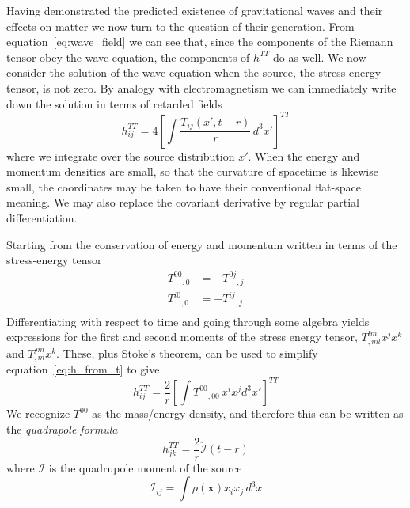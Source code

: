 Having demonstrated the predicted existence of gravitational waves and
their effects on matter we now turn to the question of their
generation.  From equation~\ref{eq:wave_field} we can see that, since
the components of the Riemann tensor obey the wave equation, the
components of $h^{TT}$ do as well.  We now consider the solution of
the wave equation when the source, the stress-energy tensor, is not
zero.  By analogy with electromagnetism we can immediately write down
the solution in terms of retarded fields
%
\begin{equation}
\label{eq:h_from_t}
h^{TT}_{ij} = 4 \left[ \int \frac{T_{ij}(x', t-r)}{r}\, d^3 x'
\right]^{TT}
\end{equation}
%
where we integrate over the source distribution $x'$.  When the energy
and momentum densities are small, so that the curvature of spacetime
is likewise small, the coordinates may be taken to have their
conventional flat-space meaning.  We may also replace the covariant
derivative by regular partial differentiation.

Starting from the conservation of energy and momentum written in terms
of the stress-energy tensor
%
\begin{align*}
{T^{00}}_{,0} &= - {T^{0j}}_{,j} \\
{T^{i0}}_{,0} &= - {T^{ij}}_{,j} \\
\end{align*}
%
Differentiating with respect to time and going through some algebra
yields expressions for the first and second moments of the stress
energy tensor, $T^{lm}_{,ml} x^j x^k$ and $T^{jm}_{,m} x^k$.  These,
plus Stoke's theorem, can be used to simplify
equation~\ref{eq:h_from_t} to give
%
\begin{equation*}
h^{TT}_{ij} = \frac{2}{r} \left[
\int {T^{00}}_{,00}\, x^i x^j d^3 x' \right]^{TT}
\end{equation*}
%
We recognize $T^{00}$ as the mass/energy density, and therefore this
can be written as the \emph{quadrapole formula}
%
\begin{equation}
\label{eq:quadrupole_formula}
h^{TT}_{jk} = \frac{2}{r} \ddot{\mathcal{I}}(t-r)
\end{equation}
%
where $\mathcal{I}$ is the quadrupole moment of the source
%
\begin{equation*}
\mathcal{I}_{ij} = \int \rho(\mathbf{x})x_i x_j\,d^3 x
\end{equation*}

